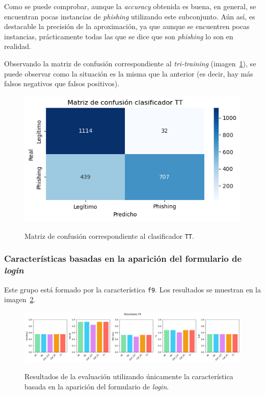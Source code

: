 Como se puede comprobar, aunque la \textit{accuracy} obtenida es buena, en general, se encuentran pocas instancias de \textit{phishing} utilizando este subconjunto. Aún así, es destacable la precisión de la aproximación, ya que aunque se encuentren pocas instancias, prácticamente todas las que se dice que son \textit{phishing} lo son en realidad.

Observando la matriz de confusión correspondiente al \textit{tri-training} (imagen~\ref{gr:ph-f1f8_tt}), se puede observar como la situación es la misma que la anterior (es decir, hay más falsos negativos que falsos positivos).

\begin{figure}[h]
	\caption[\textit{Phishing}: detección (\texttt{f1-f8}, matriz de confusión \texttt{TT})]{Matriz de confusión correspondiente al clasificador \texttt{TT}.}
	\centering
	\includegraphics[scale=0.8]{../img/memoria/5_phishing/f1f8_tt}
	\label{gr:ph-f1f8_tt}
\end{figure}

\subsubsection{Características basadas en la aparición del formulario de \textit{login}}
Este grupo está formado por la característica \texttt{f9}. Los resultados se muestran en la imagen~\ref{gr:ph-f9_small}.

\begin{figure}[h]
	\caption[\textit{Phishing}: detección (\texttt{f9})]{Resultados de la evaluación utilizando únicamente la característica basada en la aparición del formulario de \textit{login}.}
	\centering
	\includegraphics[width=\textwidth]{../img/memoria/5_phishing/f9_small}
	\label{gr:ph-f9_small}
\end{figure}

